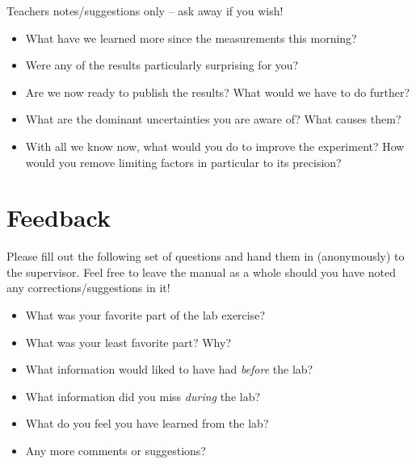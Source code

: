 \documentclass[a4,11pt, notitlepage]{article}
\begin{document}
Teachers notes/suggestions only -- ask away if you wish!

\begin{itemize}
\item What have we learned more since the measurements this morning?
\item Were any of the results particularly surprising for you?
\item Are we now ready to publish the results? What would we have to
  do further?
\item What are the dominant uncertainties you are aware of? What causes them?
\item With all we know now, what would you do to improve the
  experiment? How would you remove limiting factors in particular to its precision?
\end{itemize}

\pagebreak
\section{Feedback}
\label{sec:feedback}

Please fill out the following set of questions and hand them in
(anonymously) to the supervisor. Feel free to leave the manual as a
whole should you have noted any corrections/suggestions in it!

\begin{itemize}
\item What was your favorite part of the lab exercise?
\vspace{3cm}

\item What was your least favorite part? Why?
\vspace{3cm}

\item What information would liked to have had \emph{before} the lab?
\vspace{3cm}

\item What information did you miss \emph{during} the lab?
\vspace{3cm}

\item What do you feel you have learned from the lab?
\vspace{3cm}

\item Any more comments or suggestions?
\vspace{5cm}

\end{itemize}
\end{document}
